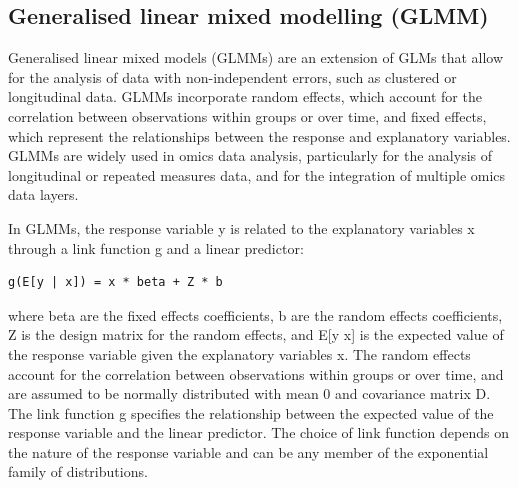 \documentclass[
]{book}
\newenvironment{Shaded}{\begin{snugshade}}{\end{snugshade}}
\newcommand{\AttributeTok}[1]{\textcolor[rgb]{0.77,0.63,0.00}{#1}}
\newcommand{\CommentTok}[1]{\textcolor[rgb]{0.56,0.35,0.01}{\textit{#1}}}
\newcommand{\FunctionTok}[1]{\textcolor[rgb]{0.00,0.00,0.00}{#1}}
\newcommand{\NormalTok}[1]{#1}
\newcommand{\OtherTok}[1]{\textcolor[rgb]{0.56,0.35,0.01}{#1}}
\newcommand{\SpecialCharTok}[1]{\textcolor[rgb]{0.00,0.00,0.00}{#1}}
\newcommand{\StringTok}[1]{\textcolor[rgb]{0.31,0.60,0.02}{#1}}
\begin{document}
\begin{Shaded}
\end{Shaded}

\normalsize

\hypertarget{generalised-linear-mixed-modelling}{%
\subsection{Generalised linear mixed modelling (GLMM)}\label{generalised-linear-mixed-modelling}}

Generalised linear mixed models (GLMMs) are an extension of GLMs that allow for the analysis of data with non-independent errors, such as clustered or longitudinal data. GLMMs incorporate random effects, which account for the correlation between observations within groups or over time, and fixed effects, which represent the relationships between the response and explanatory variables. GLMMs are widely used in omics data analysis, particularly for the analysis of longitudinal or repeated measures data, and for the integration of multiple omics data layers.

In GLMMs, the response variable y is related to the explanatory variables x through a link function g and a linear predictor:

\begin{verbatim}
g(E[y | x]) = x * beta + Z * b
\end{verbatim}

where beta are the fixed effects coefficients, b are the random effects coefficients, Z is the design matrix for the random effects, and E{[}y \textbar{} x{]} is the expected value of the response variable given the explanatory variables x. The random effects account for the correlation between observations within groups or over time, and are assumed to be normally distributed with mean 0 and covariance matrix D. The link function g specifies the relationship between the expected value of the response variable and the linear predictor. The choice of link function depends on the nature of the response variable and can be any member of the exponential family of distributions.
\end{document}
